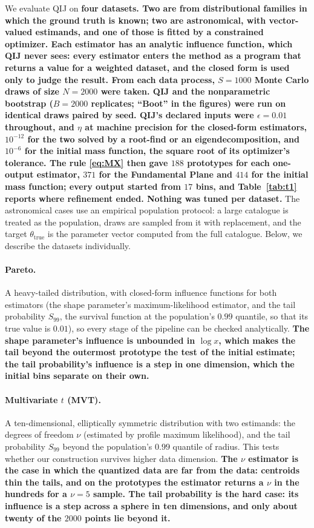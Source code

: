 \documentclass[runningheads]{llncs}
\newif\ifrev \revtrue
\newcommand{\rev}[1]{\ifrev{\color{blue}\bfseries #1}\else#1\fi}
\begin{document}
We evaluate QIJ on \rev{four datasets. Two are from distributional families in which the ground truth is known; two are astronomical, with vector-valued estimands, and one of those is fitted by a constrained optimizer. Each estimator has an analytic influence function, which QIJ never sees: every estimator enters the method as a program that returns a value for a weighted dataset, and the closed form is used only to judge the result. From each data process, $S = 1000$ Monte Carlo draws of size $N = 2000$ were taken. QIJ and the nonparametric bootstrap ($B = 2000$ replicates; ``Boot'' in the figures) were run on identical draws paired by seed. QIJ's declared inputs were $\epsilon = 0.01$ throughout, and $\eta$ at machine precision for the closed-form estimators, $10^{-12}$ for the two solved by a root-find or an eigendecomposition, and $10^{-6}$ for the initial mass function, the square root of its optimizer's tolerance. The rule \eqref{eq:MX} then gave $188$ prototypes for each one-output estimator, $371$ for the Fundamental Plane and $414$ for the initial mass function; every output started from $17$ bins, and Table~\ref{tab:t1} reports where refinement ended. Nothing was tuned per dataset.} The astronomical cases use an empirical population protocol: a large catalogue is treated as the population, draws are sampled from it with replacement, and the target $\theta_{\mathrm{true}}$ is the parameter vector computed from the full catalogue. Below, we describe the datasets individually.

\paragraph{Pareto.} A heavy-tailed distribution, with closed-form influence functions for both estimators (the shape parameter's maximum-likelihood estimator, and the tail probability $S_{99}$, the survival function at the population's $0.99$ quantile, so that its true value is $0.01$), so every stage of the pipeline can be checked analytically. \rev{The shape parameter's influence is unbounded in $\log x$, which makes the tail beyond the outermost prototype the test of the initial estimate; the tail probability's influence is a step in one dimension, which the initial bins separate on their own.}

\paragraph{Multivariate $t$ (MVT).} A ten-dimensional, elliptically symmetric distribution with two estimands: the degrees of freedom $\nu$ (estimated by profile maximum likelihood), and the tail probability $S_{99}$ beyond the population's $0.99$ quantile of radius. This tests whether our construction survives higher data dimension. \rev{The $\nu$ estimator is the case in which the quantized data are far from the data: centroids thin the tails, and on the prototypes the estimator returns a $\nu$ in the hundreds for a $\nu = 5$ sample. The tail probability is the hard case: its influence is a step across a sphere in ten dimensions, and only about twenty of the $2000$ points lie beyond it.}
\end{document}

